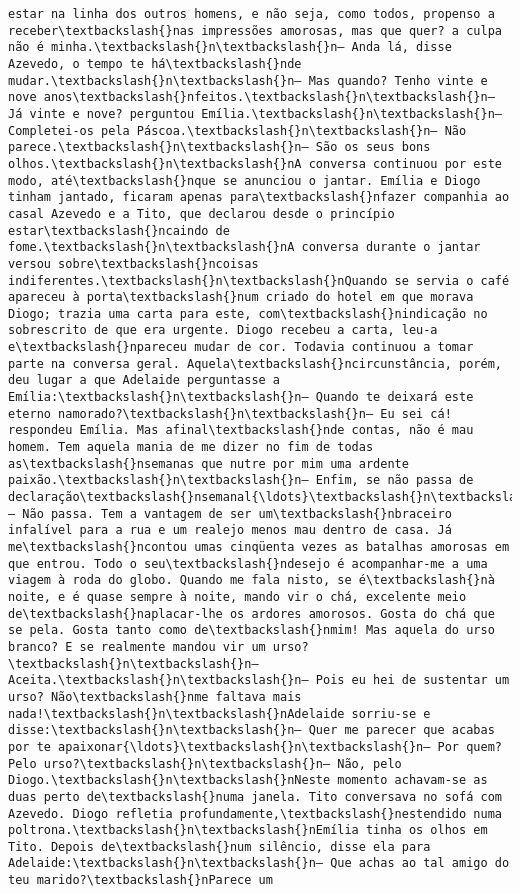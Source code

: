 \begin{Verbatim}[commandchars=\\\{\}]
estar na linha dos outros homens, e não seja, como todos, propenso a receber\textbackslash{}nas impressões amorosas, mas que quer? a culpa não é minha.\textbackslash{}n\textbackslash{}n— Anda lá, disse Azevedo, o tempo te há\textbackslash{}nde mudar.\textbackslash{}n\textbackslash{}n— Mas quando? Tenho vinte e nove anos\textbackslash{}nfeitos.\textbackslash{}n\textbackslash{}n— Já vinte e nove? perguntou Emília.\textbackslash{}n\textbackslash{}n— Completei-os pela Páscoa.\textbackslash{}n\textbackslash{}n— Não parece.\textbackslash{}n\textbackslash{}n— São os seus bons olhos.\textbackslash{}n\textbackslash{}nA conversa continuou por este modo, até\textbackslash{}nque se anunciou o jantar. Emília e Diogo tinham jantado, ficaram apenas para\textbackslash{}nfazer companhia ao casal Azevedo e a Tito, que declarou desde o princípio estar\textbackslash{}ncaindo de fome.\textbackslash{}n\textbackslash{}nA conversa durante o jantar versou sobre\textbackslash{}ncoisas indiferentes.\textbackslash{}n\textbackslash{}nQuando se servia o café apareceu à porta\textbackslash{}num criado do hotel em que morava Diogo; trazia uma carta para este, com\textbackslash{}nindicação no sobrescrito de que era urgente. Diogo recebeu a carta, leu-a e\textbackslash{}npareceu mudar de cor. Todavia continuou a tomar parte na conversa geral. Aquela\textbackslash{}ncircunstância, porém, deu lugar a que Adelaide perguntasse a Emília:\textbackslash{}n\textbackslash{}n— Quando te deixará este eterno namorado?\textbackslash{}n\textbackslash{}n— Eu sei cá! respondeu Emília. Mas afinal\textbackslash{}nde contas, não é mau homem. Tem aquela mania de me dizer no fim de todas as\textbackslash{}nsemanas que nutre por mim uma ardente paixão.\textbackslash{}n\textbackslash{}n— Enfim, se não passa de declaração\textbackslash{}nsemanal{\ldots}\textbackslash{}n\textbackslash{}n— Não passa. Tem a vantagem de ser um\textbackslash{}nbraceiro infalível para a rua e um realejo menos mau dentro de casa. Já me\textbackslash{}ncontou umas cinqüenta vezes as batalhas amorosas em que entrou. Todo o seu\textbackslash{}ndesejo é acompanhar-me a uma viagem à roda do globo. Quando me fala nisto, se é\textbackslash{}nà noite, e é quase sempre à noite, mando vir o chá, excelente meio de\textbackslash{}naplacar-lhe os ardores amorosos. Gosta do chá que se pela. Gosta tanto como de\textbackslash{}nmim! Mas aquela do urso branco? E se realmente mandou vir um urso?\textbackslash{}n\textbackslash{}n— Aceita.\textbackslash{}n\textbackslash{}n— Pois eu hei de sustentar um urso? Não\textbackslash{}nme faltava mais nada!\textbackslash{}n\textbackslash{}nAdelaide sorriu-se e disse:\textbackslash{}n\textbackslash{}n— Quer me parecer que acabas por te apaixonar{\ldots}\textbackslash{}n\textbackslash{}n— Por quem? Pelo urso?\textbackslash{}n\textbackslash{}n— Não, pelo Diogo.\textbackslash{}n\textbackslash{}nNeste momento achavam-se as duas perto de\textbackslash{}numa janela. Tito conversava no sofá com Azevedo. Diogo refletia profundamente,\textbackslash{}nestendido numa poltrona.\textbackslash{}n\textbackslash{}nEmília tinha os olhos em Tito. Depois de\textbackslash{}num silêncio, disse ela para Adelaide:\textbackslash{}n\textbackslash{}n— Que achas ao tal amigo do teu marido?\textbackslash{}nParece um 
\end{Verbatim}
